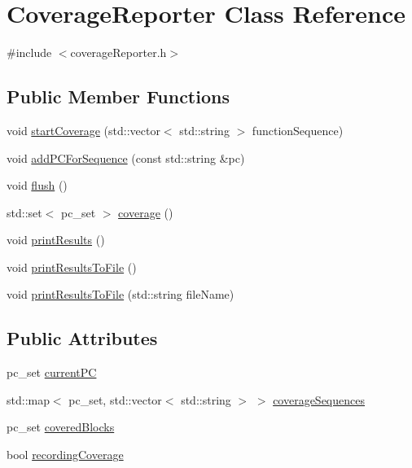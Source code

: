 \hypertarget{classCoverageReporter}{}\section{Coverage\+Reporter Class Reference}
\label{classCoverageReporter}


{\ttfamily \#include $<$coverage\+Reporter.\+h$>$}

\subsection*{Public Member Functions}
\begin{DoxyCompactItemize}
\item 
void \hyperlink{classCoverageReporter_a560eff3e34be25d1a49c37ffd99e69c1}{start\+Coverage} (std\+::vector$<$ std\+::string $>$ function\+Sequence)
\item 
void \hyperlink{classCoverageReporter_a2ec8a765cc78851be632d08383e5dcac}{add\+P\+C\+For\+Sequence} (const std\+::string \&pc)
\item 
void \hyperlink{classCoverageReporter_a046428d09487a4a3d3420caf77f436df}{flush} ()
\item 
std\+::set$<$ pc\+\_\+set $>$ \hyperlink{classCoverageReporter_af515596c46758142ea7aa7dbbab47b7e}{coverage} ()
\item 
void \hyperlink{classCoverageReporter_a4c9c89e13cc4bc7f5cb26441c1e7e723}{print\+Results} ()
\item 
void \hyperlink{classCoverageReporter_aadef25c261ffd89e68fe9e59da591247}{print\+Results\+To\+File} ()
\item 
void \hyperlink{classCoverageReporter_aa195d96544ab9b29a6a6f7fbcb11070a}{print\+Results\+To\+File} (std\+::string file\+Name)
\end{DoxyCompactItemize}
\subsection*{Public Attributes}
\begin{DoxyCompactItemize}
\item 
pc\+\_\+set \hyperlink{classCoverageReporter_a731717e0ad503323a0b541b8c1497080}{current\+PC}
\item 
std\+::map$<$ pc\+\_\+set, std\+::vector$<$ std\+::string $>$ $>$ \hyperlink{classCoverageReporter_a395e6d59cc394e670fff1e8a575fc329}{coverage\+Sequences}
\item 
pc\+\_\+set \hyperlink{classCoverageReporter_a180661161246c7f350d19ad4dfd82680}{covered\+Blocks}
\item 
bool \hyperlink{classCoverageReporter_a045c6e4451868fd74701c659f85e25c4}{recording\+Coverage}
\end{DoxyCompactItemize}


